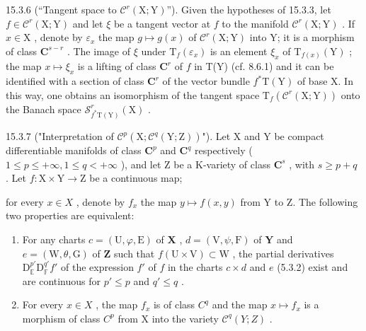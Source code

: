 15.3.6 (“Tangent space to \(\mathcal{C}^r (\mathrm{X};\mathrm{Y})\)”). Given the hypotheses of 15.3.3, let \(f\in \mathcal{C}^r (\mathrm{X};\mathrm{Y})\) and let \(\xi\) be a tangent vector at \(f\) to the manifold \(\mathcal{C}^r (\mathrm{X};\mathrm{Y})\) . If \(x\in \mathrm{X}\) , denote by \(\varepsilon_{x}\) the map \(g\mapsto g(x)\) of \(\mathcal{C}^r (\mathrm{X};\mathrm{Y})\) into Y; it is a morphism of class \(\mathbf{C}^{s - r}\) . The image of \(\xi\) under \(\mathrm{T}_f(\varepsilon_x)\) is an element \(\xi_{x}\) of \(\mathrm{T}_{f(x)}(\mathrm{Y})\) ; the map \(x\mapsto \xi_{x}\) is a lifting of class \(\mathbf{C}^r\) of \(f\) in T(Y) (cf. 8.6.1) and it can be identified with a section of class \(\mathbf{C}^r\) of the vector bundle \(f^{*}\mathrm{T}(\mathrm{Y})\) of base X. In this way, one obtains an isomorphism of the tangent space \(\mathrm{T}_f(\mathcal{C}^r (\mathrm{X};\mathrm{Y}))\) onto the Banach space \(\mathcal{S}_{f^{*}\mathrm{T}(\mathrm{Y})}^r (\mathrm{X})\) .

15.3.7 ("Interpretation of \(\mathcal{C}^{p}(\mathrm{X};\mathcal{C}^{q}(\mathrm{Y};\mathrm{Z}))\)"). Let X and Y be compact differentiable manifolds of class \(\mathbf{C}^{p}\) and \(\mathbf{C}^{q}\) respectively ( \(1\leqslant p\leqslant+\infty,1\leqslant q<+\infty\) ), and let Z be a K-variety of class \(\mathbf{C}^{s}\) , with \(s\geqslant p+q\) . Let \(f\colon\mathrm{X}\times\mathrm{Y}\to\mathrm{Z}\) be a continuous map;

for every \(x \in X\) , denote by \(f_x\) the map \(y \mapsto f(x, y)\) from Y to Z. The following two properties are equivalent:

\begin{enumerate}
\def\labelenumi{\alph{enumi})}
\item
  For any charts \(c = (\mathrm{U}, \varphi, \mathrm{E})\) of \(\mathbf{X}\) , \(d = (\mathrm{V}, \psi, \mathrm{F})\) of \(\mathbf{Y}\) and \(e = (\mathrm{W}, \theta, \mathrm{G})\) of \(\mathbf{Z}\) such that \(f(\mathrm{U} \times \mathrm{V}) \subset \mathrm{W}\) , the partial derivatives \(\mathrm{D}_{\mathbb{E}}^{p'} \mathrm{D}_{\mathbb{F}}^{q'} f'\) of the expression \(f'\) of \(f\) in the charts \(c \times d\) and \(e\) (5.3.2) exist and are continuous for \(p' \leqslant p\) and \(q' \leqslant q\) .
\item
  For every \(x \in X\) , the map \(f_{x}\) is of class \(C^{q}\) and the map \(x \mapsto f_{x}\) is a morphism of class \(C^{p}\) from X into the variety \(\mathcal{C}^{q}(Y; Z)\) .
\end{enumerate}

